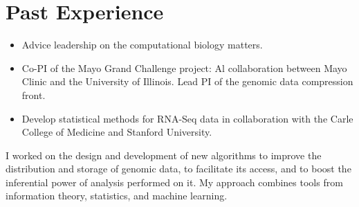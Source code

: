 \documentclass[11pt,a4paper,sans]{moderncv}        %
\begin{document}





\section{Past Experience}


\begin{itemize}
\item Advice leadership on the computational biology matters.
\item Co-PI of the Mayo Grand Challenge project: Al collaboration between Mayo Clinic and the University of Illinois. Lead PI of the genomic data compression front.
\item Develop statistical methods for RNA-Seq data in collaboration with the Carle College of Medicine and Stanford University.\\
\end{itemize}


I worked on the design and development of new algorithms to improve the distribution and storage of genomic data, to facilitate its access, and to boost the inferential power of analysis performed on it. My approach combines tools from information theory, statistics, and machine learning.
\end{document}
